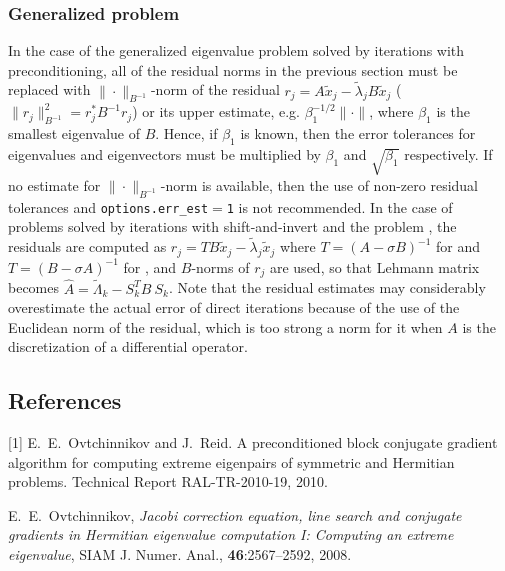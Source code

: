 \subsubsection{Generalized problem}

In the case
of the generalized eigenvalue problem 
solved by iterations with preconditioning,
all of the residual norms in the previous section must be replaced
with %
$\|\cdot\|_{B^{-1}}$-norm of the residual
$r_j = A \tilde x_j - \tilde\lambda_j B \tilde x_j$
($\|r_j\|_{B^{-1}}^2 = r_j^* B^{-1} r_j$)
or its upper estimate, e.g. 
$\beta_1^{-1/2}\|\cdot\|$,
where $\beta_1$ is the smallest eigenvalue of $B$.
Hence, if $\beta_1$ is known, then
the error tolerances for eigenvalues and eigenvectors
must be multiplied by $\beta_1$ and $\sqrt{\beta_1}$
respectively. If no estimate for $\|\cdot\|_{B^{-1}}$-norm
is available, then the use of
non-zero residual tolerances and
{\tt options.err\_est$=$1}
is not recommended.
In the case of problems  solved by 
iterations with shift-and-invert
and the problem ,
the residuals are computed as
$r_j = T B \tilde x_j - \tilde \lambda_j \tilde x_j$
where
$T = (A - \sigma B)^{-1}$ for  and
$T = (B - \sigma A)^{-1}$ for ,
and $B$-norms of $r_j$ are used, so that
Lehmann matrix becomes
$\hat A = \tilde\Lambda_k - S_k^T B\ S_k$.
Note that the residual estimates 
may considerably overestimate the actual error of direct iterations
because  of the use of the Euclidean norm of the residual,
which is too strong a norm for it
when $A$ is the discretization of a differential operator.
\fi

\subsection*{References}

[1]
E.~E.~Ovtchinnikov and J.~Reid.
A preconditioned block conjugate gradient
algorithm for computing extreme eigenpairs
of symmetric and Hermitian problems.
Technical Report RAL-TR-2010-19, 2010.

\noindent
[2]
E.~E.~Ovtchinnikov,
{\em Jacobi correction equation, line search and
conjugate gradients in Hermitian eigenvalue computation I:
Computing an extreme eigenvalue},
SIAM J. Numer. Anal., {\bf 46}:2567--2592, 2008.

